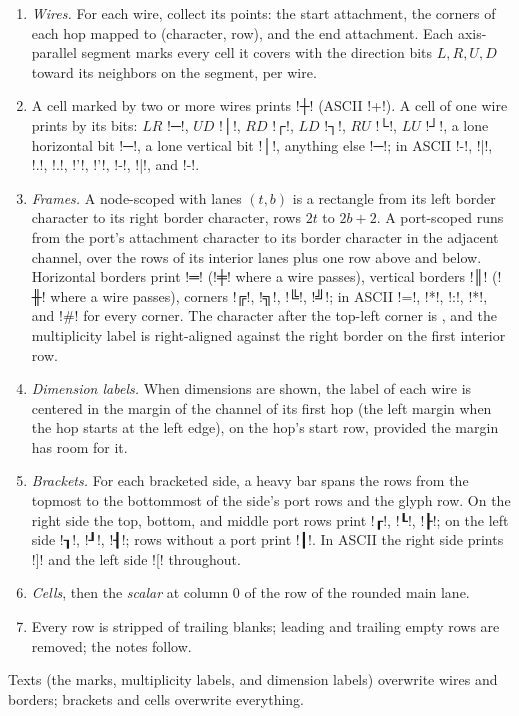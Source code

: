 {\begin{algorithm}\label{alg:pictorial-paint}
\begin{enumerate}
  \item \emph{Wires.} For each wire, collect its points: the start attachment, the corners of
    each hop mapped to (character, row), and the end attachment. Each axis-parallel segment
    marks every cell it covers with the direction bits $L, R, U, D$ toward its neighbors on the
    segment, per wire.
  \item A cell marked by two or more wires prints \pgi!┼! (ASCII \code!+!). A cell of one wire
    prints by its bits: $LR$ \pgi!─!, $UD$ \pgi!│!, $RD$ \pgi!┌!, $LD$ \pgi!┐!, $RU$ \pgi!└!,
    $LU$ \pgi!┘!, a lone horizontal bit \pgi!─!, a lone vertical bit \pgi!│!, anything else
    \pgi!─!; in ASCII \code!-!, \code!|!, \code!.!, \code!.!, \code!'!, \code!'!, \code!-!,
    \code!|!, and \code!-!.
  \item \emph{Frames.} A node-scoped \bbox{} with lanes $(t,b)$ is a rectangle from its left
    border character to its right border character, rows $2t$ to $2b+2$. A port-scoped
    \bbox{} runs from the port's attachment character to its border character in the adjacent
    channel, over the rows of its interior lanes plus one row above and below. Horizontal
    borders print \pgi!═! (\pgi!╪! where a wire passes), vertical borders \pgi!║! (\pgi!╫!
    where a wire passes), corners \pgi!╔!, \pgi!╗!, \pgi!╚!, \pgi!╝!; in ASCII \code!=!,
    \code!*!, \code!:!, \code!*!, and \code!#! for every corner. The character after the
    top-left corner is \code{!}, and the multiplicity label is right-aligned against the right
    border on the first interior row.
  \item \emph{Dimension labels.} When dimensions are shown, the label of each wire is centered in
    the margin of the channel of its first hop (the left margin when the hop starts at the left
    edge), on the hop's start row, provided the margin has room for it.
  \item \emph{Brackets.} For each bracketed side, a heavy bar spans the rows from the topmost to
    the bottommost of the side's port rows and the glyph row. On the right side the top, bottom,
    and middle port rows print \pgi!┎!, \pgi!┖!, \pgi!┠!; on the left side \pgi!┒!, \pgi!┚!,
    \pgi!┨!; rows without a port print \pgi!┃!. In ASCII the right side prints \code!]! and the
    left side \code![! throughout.
  \item \emph{Cells}, then the \emph{scalar} at column 0 of the row of the rounded main lane.
  \item Every row is stripped of trailing blanks; leading and trailing empty rows are removed;
    the notes follow.
\end{enumerate}
Texts (the \code{!} marks, multiplicity labels, and dimension labels) overwrite wires and
borders; brackets and cells overwrite everything.
\end{algorithm}

}
